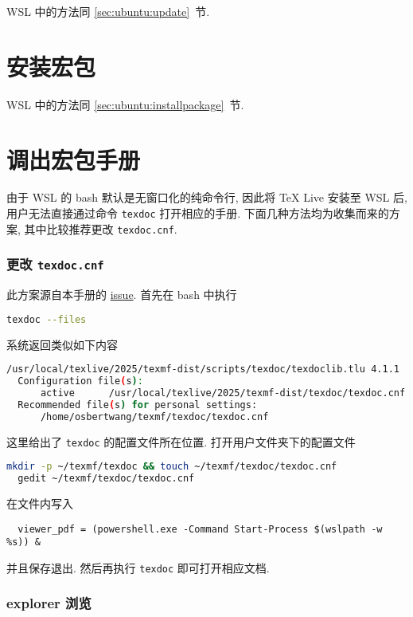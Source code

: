 WSL 中的方法同 \ref{sec:ubuntu:update}~节.

\section{安装宏包}

WSL 中的方法同 \ref{sec:ubuntu:installpackage}~节.

\section{调出宏包手册}

由于 WSL 的 \textsf{bash} 默认是无窗口化的纯命令行,
因此将 \TeX{} Live 安装至 WSL 后,
用户无法直接通过命令 \texttt{texdoc} 打开相应的手册.
下面几种方法均为收集而来的方案,
其中比较推荐更改 \texttt{texdoc.cnf}.

\subsubsection{更改 \texttt{texdoc.cnf}}

此方案源自本手册的 \href{https://github.com/OsbertWang/install-latex-guide-zh-cn/issues/13}{issue}.
首先在 \textsf{bash} 中执行
\begin{lstlisting}[language=bash]
  texdoc --files
\end{lstlisting}
系统返回类似如下内容
\begin{lstlisting}[language=bash]
  /usr/local/texlive/2025/texmf-dist/scripts/texdoc/texdoclib.tlu 4.1.1
  Configuration file(s):
      active      /usr/local/texlive/2025/texmf-dist/texdoc/texdoc.cnf
  Recommended file(s) for personal settings:
      /home/osbertwang/texmf/texdoc/texdoc.cnf
\end{lstlisting}
这里给出了 \texttt{texdoc} 的配置文件所在位置.
打开用户文件夹下的配置文件
\begin{lstlisting}[language=bash]
  mkdir -p ~/texmf/texdoc && touch ~/texmf/texdoc/texdoc.cnf
  gedit ~/texmf/texdoc/texdoc.cnf
\end{lstlisting}
在文件内写入
\begin{lstlisting}
  viewer_pdf = (powershell.exe -Command Start-Process $(wslpath -w %s)) &
\end{lstlisting}
并且保存退出.
然后再执行 \texttt{texdoc} 即可打开相应文档.

\subsubsection{explorer 浏览}

